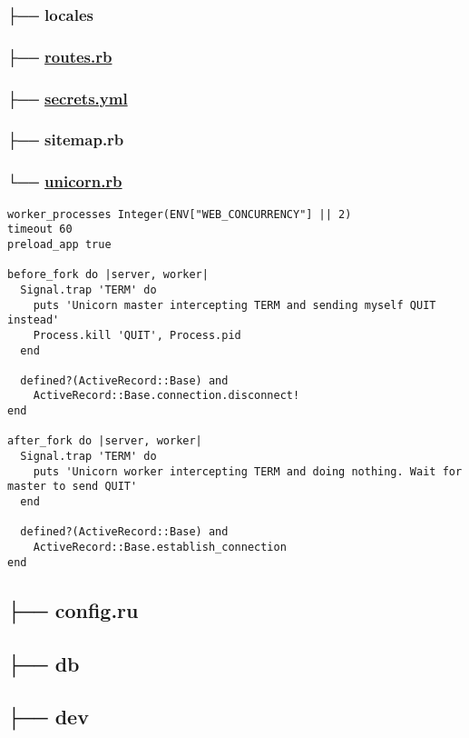 \documentclass[11pt]{article}
\begin{document}
\subsubsection*{├── locales}
\label{sec-1-4-7}
\subsubsection*{├── \href{./config/routes.rb}{routes.rb}}
\label{sec-1-4-8}
\subsubsection*{├── \href{./config/secrets.yml}{secrets.yml}}
\label{sec-1-4-9}
\subsubsection*{├── sitemap.rb}
\label{sec-1-4-10}
\subsubsection*{└── \href{./config/unicorn.rb}{unicorn.rb}}
\label{sec-1-4-11}

\begin{verbatim}
worker_processes Integer(ENV["WEB_CONCURRENCY"] || 2)
timeout 60
preload_app true

before_fork do |server, worker|
  Signal.trap 'TERM' do
    puts 'Unicorn master intercepting TERM and sending myself QUIT instead'
    Process.kill 'QUIT', Process.pid
  end

  defined?(ActiveRecord::Base) and
    ActiveRecord::Base.connection.disconnect!
end

after_fork do |server, worker|
  Signal.trap 'TERM' do
    puts 'Unicorn worker intercepting TERM and doing nothing. Wait for master to send QUIT'
  end

  defined?(ActiveRecord::Base) and
    ActiveRecord::Base.establish_connection
end
\end{verbatim}

\subsection*{├── config.ru}
\label{sec-1-5}
\subsection*{├── db}
\label{sec-1-6}
\subsection*{├── dev}
\label{sec-1-7}
\end{document}
